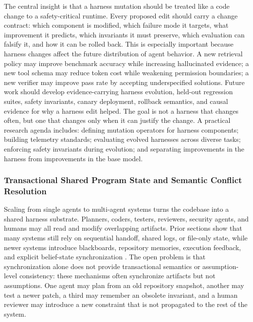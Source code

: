 The central insight is that a harness mutation should be treated like a code change to a safety-critical runtime. Every proposed edit should carry a change contract: which component is modified, which failure mode it targets, what improvement it predicts, which invariants it must preserve, which evaluation can falsify it, and how it can be rolled back. This is especially important because harness changes affect the future distribution of agent behavior. A new retrieval policy may improve benchmark accuracy while increasing hallucinated evidence; a new tool schema may reduce token cost while weakening permission boundaries; a new verifier may improve pass rate by accepting underspecified solutions. Future work should develop evidence-carrying harness evolution, held-out regression suites, safety invariants, canary deployment, rollback semantics, and causal evidence for why a harness edit helped. The goal is not a harness that changes often, but one that changes only when it can justify the change. A practical research agenda includes: defining mutation operators for harness components; building telemetry standards; evaluating evolved harnesses across diverse tasks; enforcing safety invariants during evolution; and separating improvements in the harness from improvements in the base model.


\subsubsection{Transactional Shared Program State and Semantic Conflict Resolution}

Scaling from single agents to multi-agent systems turns the codebase into a shared harness substrate. Planners, coders, testers, reviewers, security agents, and humans may all read and modify overlapping artifacts. Prior sections show that many systems still rely on sequential handoff, shared logs, or file-only state, while newer systems introduce blackboards, repository memories, execution feedback, and explicit belief-state synchronization \citep{Qian2023ChatDev,Hong2023MetaGPT,huang2023agentcoder,wang2025openhands,Guo2025SyncMind}. The open problem is that synchronization alone does not provide transactional semantics or assumption-level consistency: these mechanisms often synchronize artifacts but not assumptions. One agent may plan from an old repository snapshot, another may test a newer patch, a third may remember an obsolete invariant, and a human reviewer may introduce a new constraint that is not propagated to the rest of the system.

